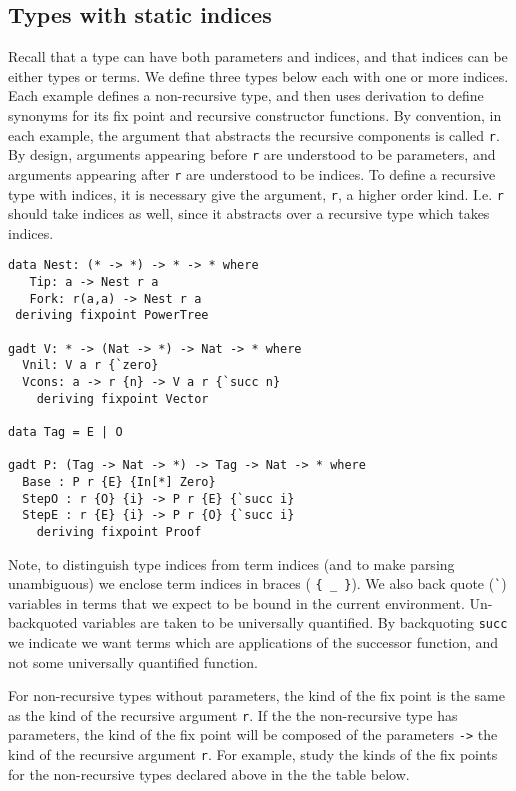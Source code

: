\subsection{Types with static indices}\label{sec:bg:ixty}
Recall that a type can have both parameters and indices, and that indices
can be either types or terms. We define three
types below each with one or more indices. Each example defines a non-recursive type, and
then uses derivation to define synonyms for its fix point and recursive constructor
functions. By convention, in each example, the argument that abstracts the recursive components
is called \verb+r+. By design, arguments appearing before \verb+r+ are understood to be
parameters, and arguments appearing after \verb+r+ are understood to be indices. To define a
recursive type with indices, it is necessary give the argument, \verb+r+,
a higher order kind. I.e. \verb+r+ should take indices as well, since it
abstracts over a recursive type which takes indices.

{\small
\begin{verbatim}
data Nest: (* -> *) -> * -> * where
   Tip: a -> Nest r a
   Fork: r(a,a) -> Nest r a
 deriving fixpoint PowerTree
  
gadt V: * -> (Nat -> *) -> Nat -> * where
  Vnil: V a r {`zero}
  Vcons: a -> r {n} -> V a r {`succ n}
    deriving fixpoint Vector

data Tag = E | O

gadt P: (Tag -> Nat -> *) -> Tag -> Nat -> * where
  Base : P r {E} {In[*] Zero} 
  StepO : r {O} {i} -> P r {E} {`succ i}
  StepE : r {E} {i} -> P r {O} {`succ i}
    deriving fixpoint Proof
\end{verbatim}}

Note, to distinguish type indices from term indices (and to make parsing unambiguous)
we enclose term indices in braces ( \verb+{ _ }+). We also back quote (\verb+`+)
variables in terms that we expect to be bound in the current environment. 
Un-backquoted
variables are taken to be universally quantified. By
backquoting \verb+succ+ we indicate we
want terms which are applications of the successor function, and not some
universally quantified function.

For non-recursive types without parameters, the kind of the fix point
is the same as the kind of the recursive argument \verb+r+. If the the non-recursive
type has parameters, the kind of the fix point will be composed
of the parameters \verb+->+ the kind of the recursive argument \verb+r+. For example,
study the kinds of the fix points for the non-recursive
types declared above in the the table below.

